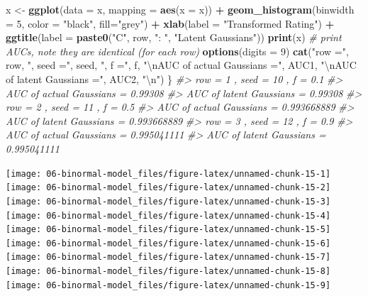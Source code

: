 \documentclass[
]{book}
\newenvironment{Shaded}{\begin{snugshade}}{\end{snugshade}}
\newcommand{\CharTok}[1]{\textcolor[rgb]{0.31,0.60,0.02}{#1}}
\newcommand{\CommentTok}[1]{\textcolor[rgb]{0.56,0.35,0.01}{\textit{#1}}}
\newcommand{\DataTypeTok}[1]{\textcolor[rgb]{0.13,0.29,0.53}{#1}}
\newcommand{\DecValTok}[1]{\textcolor[rgb]{0.00,0.00,0.81}{#1}}
\newcommand{\KeywordTok}[1]{\textcolor[rgb]{0.13,0.29,0.53}{\textbf{#1}}}
\newcommand{\NormalTok}[1]{#1}
\newcommand{\OperatorTok}[1]{\textcolor[rgb]{0.81,0.36,0.00}{\textbf{#1}}}
\newcommand{\StringTok}[1]{\textcolor[rgb]{0.31,0.60,0.02}{#1}}
\begin{document}
\begin{Shaded}
\begin{Highlighting}[]
\NormalTok{  x <-}\StringTok{  }\KeywordTok{ggplot}\NormalTok{(}\DataTypeTok{data =}\NormalTok{ x, }\DataTypeTok{mapping =} \KeywordTok{aes}\NormalTok{(}\DataTypeTok{x =}\NormalTok{ x)) }\OperatorTok{+}
\StringTok{    }\KeywordTok{geom_histogram}\NormalTok{(}\DataTypeTok{binwidth =} \DecValTok{5}\NormalTok{, }\DataTypeTok{color =} \StringTok{"black"}\NormalTok{, }\DataTypeTok{fill=}\StringTok{"grey"}\NormalTok{) }\OperatorTok{+}
\StringTok{    }\KeywordTok{xlab}\NormalTok{(}\DataTypeTok{label =} \StringTok{"Transformed Rating"}\NormalTok{) }\OperatorTok{+}\StringTok{ }
\StringTok{    }\KeywordTok{ggtitle}\NormalTok{(}\DataTypeTok{label =} \KeywordTok{paste0}\NormalTok{(}\StringTok{"C"}\NormalTok{, row, }\StringTok{": "}\NormalTok{, }\StringTok{"Latent Gaussians"}\NormalTok{))}
  \KeywordTok{print}\NormalTok{(x)}
\CommentTok{# print AUCs, note they are identical (for each row)  }
\KeywordTok{options}\NormalTok{(}\DataTypeTok{digits =} \DecValTok{9}\NormalTok{)}
  \KeywordTok{cat}\NormalTok{(}\StringTok{"row ="}\NormalTok{, row, }\StringTok{", seed ="}\NormalTok{, seed, }\StringTok{", f ="}\NormalTok{, f, }
      \StringTok{"}\CharTok{\textbackslash{}n}\StringTok{AUC of actual Gaussians ="}\NormalTok{, AUC1, }
      \StringTok{"}\CharTok{\textbackslash{}n}\StringTok{AUC of latent Gaussians ="}\NormalTok{, AUC2, }\StringTok{"}\CharTok{\textbackslash{}n}\StringTok{"}\NormalTok{)}
\NormalTok{\}}
\CommentTok{#> row = 1 , seed = 10 , f = 0.1 }
\CommentTok{#> AUC of actual Gaussians = 0.99308 }
\CommentTok{#> AUC of latent Gaussians = 0.99308}
\CommentTok{#> row = 2 , seed = 11 , f = 0.5 }
\CommentTok{#> AUC of actual Gaussians = 0.993668889 }
\CommentTok{#> AUC of latent Gaussians = 0.993668889}
\CommentTok{#> row = 3 , seed = 12 , f = 0.9 }
\CommentTok{#> AUC of actual Gaussians = 0.995041111 }
\CommentTok{#> AUC of latent Gaussians = 0.995041111}
\end{Highlighting}
\end{Shaded}

\texttt{[image: 06-binormal-model\_files/figure-latex/unnamed-chunk-15-1]} \texttt{[image: 06-binormal-model\_files/figure-latex/unnamed-chunk-15-2]} \texttt{[image: 06-binormal-model\_files/figure-latex/unnamed-chunk-15-3]} \texttt{[image: 06-binormal-model\_files/figure-latex/unnamed-chunk-15-4]} \texttt{[image: 06-binormal-model\_files/figure-latex/unnamed-chunk-15-5]} \texttt{[image: 06-binormal-model\_files/figure-latex/unnamed-chunk-15-6]} \texttt{[image: 06-binormal-model\_files/figure-latex/unnamed-chunk-15-7]} \texttt{[image: 06-binormal-model\_files/figure-latex/unnamed-chunk-15-8]} \texttt{[image: 06-binormal-model\_files/figure-latex/unnamed-chunk-15-9]}
\end{document}
